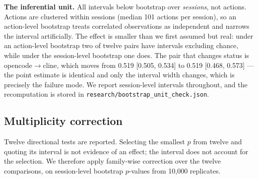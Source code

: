 \documentclass[11pt]{article}
\begin{document}
\textbf{The inferential unit.} All intervals below bootstrap over
\emph{sessions}, not actions. Actions are clustered within sessions
(median 101 actions per session), so an action-level bootstrap treats
correlated observations as independent and narrows the interval
artificially. The effect is smaller than we first assumed but real: under
an action-level bootstrap two of twelve pairs have intervals excluding
chance, while under the session-level bootstrap one does. The pair that
changes status is opencode$\to$cline, which moves from 0.519 [0.505, 0.534]
to 0.519 [0.468, 0.573] --- the point estimate is identical and only the
interval width changes, which is precisely the failure mode. We report
session-level intervals throughout, and the recomputation is stored in
\texttt{research/bootstrap\_unit\_check.json}.

\subsection{Multiplicity correction}
\label{sec:multiplicity}

Twelve directional tests are reported. Selecting the smallest $p$ from twelve
and quoting its interval is not evidence of an effect; the interval does not
account for the selection. We therefore apply family-wise correction over the
twelve comparisons, on session-level bootstrap $p$-values from 10{,}000
replicates.
\end{document}
